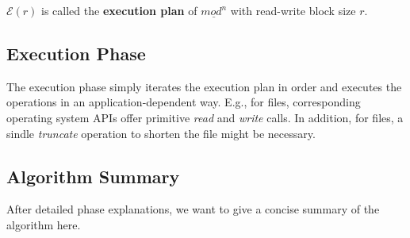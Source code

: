 \documentclass[english, 10pt, openright, twocolumn, landscape, twoside, notitlepage, a4paper, pdftex]		
{article}
\begin{document}
$\mathcal{E}(r)$ is called the \textbf{execution plan} of $\underline{mod^{n}}$ with read-write block size $r$.

\subsection{Execution Phase}%
\label{sec:ExecutionPhase}%

The execution phase simply iterates the execution plan in order and executes the operations in an application-dependent way. E.g., for files, corresponding operating system APIs offer primitive \emph{read} and \emph{write} calls. In addition, for files, a sindle \emph{truncate} operation to shorten the file might be necessary.

\subsection{Algorithm Summary}%
\label{sec:AlgorithmSummary}%

After detailed phase explanations, we want to give a concise summary of the algorithm here.
\end{document}

